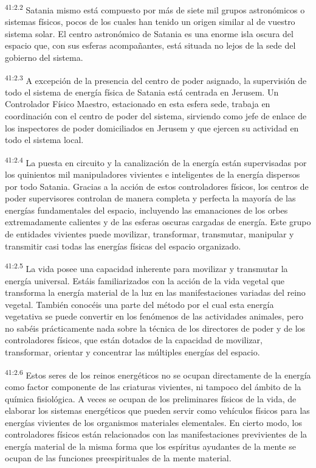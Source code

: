 \par
\textsuperscript{41:2.2} Satania mismo está compuesto por más de siete mil grupos astronómicos o sistemas físicos, pocos de los cuales han tenido un origen similar al de vuestro sistema solar. El centro astronómico de Satania es una enorme isla oscura del espacio que, con sus esferas acompañantes, está situada no lejos de la sede del gobierno del sistema.

\par
\textsuperscript{41:2.3} A excepción de la presencia del centro de poder asignado, la supervisión de todo el sistema de energía física de Satania está centrada en Jerusem. Un Controlador Físico Maestro, estacionado en esta esfera sede, trabaja en coordinación con el centro de poder del sistema, sirviendo como jefe de enlace de los inspectores de poder domiciliados en Jerusem y que ejercen su actividad en todo el sistema local.

\par
\textsuperscript{41:2.4} La puesta en circuito y la canalización de la energía están supervisadas por los quinientos mil manipuladores vivientes e inteligentes de la energía dispersos por todo Satania. Gracias a la acción de estos controladores físicos, los centros de poder supervisores controlan de manera completa y perfecta la mayoría de las energías fundamentales del espacio, incluyendo las emanaciones de los orbes extremadamente calientes y de las esferas oscuras cargadas de energía. Este grupo de entidades vivientes puede movilizar, transformar, transmutar, manipular y transmitir casi todas las energías físicas del espacio organizado.

\par
\textsuperscript{41:2.5} La vida posee una capacidad inherente para movilizar y transmutar la energía universal. Estáis familiarizados con la acción de la vida vegetal que transforma la energía material de la luz en las manifestaciones variadas del reino vegetal. También conocéis una parte del método por el cual esta energía vegetativa se puede convertir en los fenómenos de las actividades animales, pero no sabéis prácticamente nada sobre la técnica de los directores de poder y de los controladores físicos, que están dotados de la capacidad de movilizar, transformar, orientar y concentrar las múltiples energías del espacio.

\par
\textsuperscript{41:2.6} Estos seres de los reinos energéticos no se ocupan directamente de la energía como factor componente de las criaturas vivientes, ni tampoco del ámbito de la química fisiológica. A veces se ocupan de los preliminares físicos de la vida, de elaborar los sistemas energéticos que pueden servir como vehículos físicos para las energías vivientes de los organismos materiales elementales. En cierto modo, los controladores físicos están relacionados con las manifestaciones previvientes de la energía material de la misma forma que los espíritus ayudantes de la mente se ocupan de las funciones preespirituales de la mente material.


